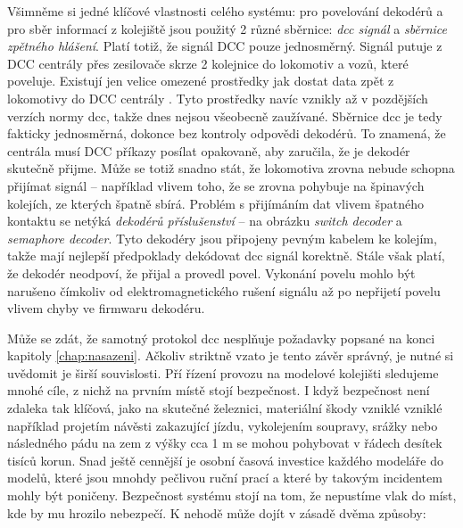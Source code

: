 Všimněme si jedné klíčové vlastnosti celého systému: pro povelování dekodérů a
pro sběr informací z kolejiště jsou použitý 2 různé sběrnice: \textit{dcc
signál} a \textit{sběrnice zpětného hlášení}. Platí totiž, že signál DCC pouze
jednosměrný. Signál putuje z DCC centrály přes zesilovače skrze 2 kolejnice do
lokomotiv a vozů, které poveluje. Existují jen velice omezené prostředky
jak dostat data zpět z lokomotivy do DCC centrály \cite{railcom}. Tyto
prostředky navíc vznikly až v pozdějších verzích normy \gls{dcc}, takže dnes
nejsou všeobecně zaužívané. Sběrnice \gls{dcc} je tedy fakticky jednosměrná,
dokonce bez kontroly odpovědi dekodérů. To znamená, že centrála musí DCC příkazy
posílat opakovaně, aby zaručila, že je dekodér skutečně přijme. Může se totiž
snadno stát, že lokomotiva zrovna nebude schopna přijímat signál – například
vlivem toho, že se zrovna pohybuje na špinavých kolejích, ze kterých špatně
sbírá. Problém s přijímáním dat vlivem špatného kontaktu se netýká \textit{dekodérů
příslušenství} – na obrázku \textit{switch decoder} a \textit{semaphore decoder}.
Tyto dekodéry jsou připojeny pevným kabelem ke kolejím, takže mají nejlepší
předpoklady dekódovat \gls{dcc} signál korektně. Stále však platí, že dekodér
neodpoví, že přijal a provedl povel. Vykonání povelu mohlo být narušeno čímkoliv
od elektromagnetického rušení signálu až po nepřijetí povelu vlivem chyby ve
firmwaru dekodéru.

Může se zdát, že samotný protokol \gls{dcc} nesplňuje požadavky popsané na
konci kapitoly \ref{chap:nasazeni}. Ačkoliv striktně vzato je tento závěr
správný, je nutné si uvědomit je širší souvislosti. Pří řízení provozu na
modelové kolejišti sledujeme mnohé cíle, z nichž na prvním místě stojí
bezpečnost. I když bezpečnost není zdaleka tak klíčová, jako na skutečné
železnici, materiální škody vzniklé vzniklé například projetím návěsti
zakazující jízdu, vykolejením soupravy, srážky nebo následného pádu na zem
z výšky cca 1 m se mohou pohybovat v řádech desítek tisíců korun. Snad ještě
cennější je osobní časová investice každého modeláře do modelů, které jsou
mnohdy pečlivou ruční prací a které by takovým incidentem mohly být poničeny.
Bezpečnost systému stojí na tom, že nepustíme vlak do míst, kde by mu hrozilo
nebezpečí. K nehodě může dojít v zásadě dvěma způsoby:

